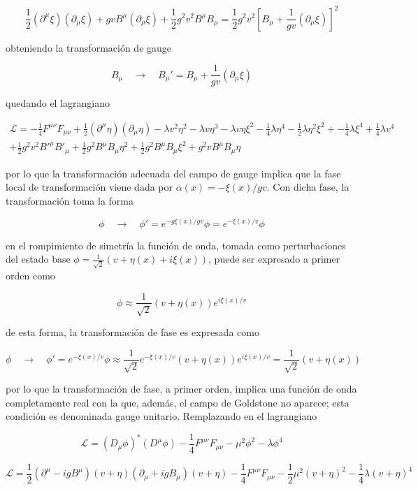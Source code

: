$$ \frac{1}{2}(\partial^{\mu}\xi)(\partial_{\mu}\xi) + gvB^{\mu}(\partial_{\mu}\xi) +\frac{1}{2}g^2v^2B^{\mu}B_{\mu} =\frac{1}{2}g^2v^2\left[B_{\mu} + \frac{1}{gv}(\partial_{\mu}\xi)\right]^2$$

obteniendo la transformación de gauge

$$ B_{\mu} \quad \longrightarrow \quad B_{\mu}' = B_{\mu} + \frac{1}{gv}(\partial_{\mu}\xi) $$

quedando el lagrangiano

\begin{multline}
    \mathcal{L} = -\frac{1}{4}F^{\mu\nu}F_{\mu\nu} + \frac{1}{2}(\partial^{\mu}\eta)(\partial_{\mu}\eta) - \lambda v^2\eta^2 - \lambda v\eta^3 - \lambda v\eta\xi^2 - \frac{1}{4}\lambda\eta^4 - \frac{1}{2}\lambda\eta^2\xi^2 + - \frac{1}{4}\lambda\xi^4 + \frac{1}{4}\lambda v^4\\ 
    +\frac{1}{2}g^2v^2B'^{\mu}B'_{\mu} + \frac{1}{2}g^2B^{\mu}B_{\mu}\eta^2 + \frac{1}{2}g^2B^{\mu}B_{\mu}\xi^2 +g^2vB^{\mu}B_{\mu}\eta
\end{multline}

por lo que la transformación adecuada del campo de gauge implica que la fase local de transformación viene dada por $\alpha(x) = -\xi(x)/gv$. Con dicha fase, la transformación toma la forma

$$ \phi \quad \longrightarrow \quad \phi' = e^{-g\xi(x)/gv}\phi = e^{-\xi(x)/v}\phi $$

en el rompimiento de simetría la función de onda, tomada como perturbaciones del estado base $\phi=\frac{1}{\sqrt{2}}(v+\eta(x)+i\xi(x))$, puede ser expresado a primer orden como 

$$ \phi \approx \frac{1}{\sqrt{2}}(v+\eta(x))e^{i\xi(x)/v} $$

de esta forma, la transformación de fase es expresada como

$$ \phi \quad \longrightarrow \quad \phi' = e^{-\xi(x)/v}\phi \approx\frac{1}{\sqrt{2}} e^{-\xi(x)/v}  (v+\eta(x))e^{i\xi(x)/v} = \frac{1}{\sqrt{2}}(v + \eta(x))  $$

por lo que la transformación de fase, a primer orden, implica una función de onda completamente real con la que, además, el campo de Goldstone no aparece; esta condición es denominada gauge unitario. Remplazando en el lagrangiano

$$ \mathcal{L} = (D_{\mu}\phi)^*(D^{\mu}\phi) -\frac{1}{4}F^{\mu\nu}F_{\mu\nu} - \mu^2\phi^2 - \lambda \phi^4 $$

$$ \mathcal{L} = \frac{1}{2}(\partial^{\mu} - igB^{\mu})(v+\eta)(\partial_{\mu} + igB_{\mu})(v+\eta) - \frac{1}{4}F^{\mu\nu}F_{\mu\nu} -\frac{1}{2}\mu^2 (v+\eta)^2 - \frac{1}{4}\lambda (v+\eta)^4  $$

